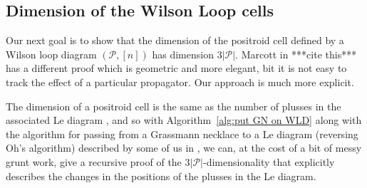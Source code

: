 \documentclass[11pt]{article}
\newcommand{\cP}{\mathcal{P}}
\theoremstyle{remark}
\theoremstyle{definition}
\begin{document}
\subsection{Dimension of the Wilson Loop cells}

Our next goal is to show that the dimension of the positroid cell defined by a Wilson loop diagram $(\cP, [n])$ has dimension $3|\cP|$.  Marcott in ***cite this*** has a different proof which is geometric and more elegant, bit it is not easy to track the effect of a particular propagator.  Our approach is much more explicit.


The dimension of a positroid cell is the same as the number of plusses in the associated Le diagram \cite[Theorem 6.5]{Postnikov}, and so with Algorithm~\ref{alg:put GN on WLD} along with the algorithm for passing from a Grassmann necklace to a Le diagram (reversing Oh's algorithm) described by some of us in \cite{reversingOh}, we can, at the cost of a bit of messy grunt work, give a recursive proof of the $3|\cP|$-dimensionality that explicitly describes the changes in the positions of the plusses in the Le diagram.

%
%
%
%
%
\end{document}
